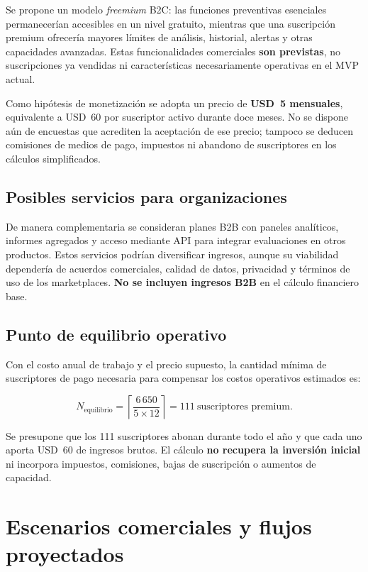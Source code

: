 Se propone un modelo \textit{freemium} B2C: las funciones preventivas esenciales permanecerían accesibles en un nivel gratuito, mientras que una suscripción premium ofrecería mayores límites de análisis, historial, alertas y otras capacidades avanzadas. Estas funcionalidades comerciales \textbf{son previstas}, no suscripciones ya vendidas ni características necesariamente operativas en el MVP actual.

Como hipótesis de monetización se adopta un precio de \textbf{USD~5 mensuales}, equivalente a USD~60 por suscriptor activo durante doce meses. No se dispone aún de encuestas que acrediten la aceptación de ese precio; tampoco se deducen comisiones de medios de pago, impuestos ni abandono de suscriptores en los cálculos simplificados.

\subsection{Posibles servicios para organizaciones}

De manera complementaria se consideran planes B2B con paneles analíticos, informes agregados y acceso mediante API para integrar evaluaciones en otros productos. Estos servicios podrían diversificar ingresos, aunque su viabilidad dependería de acuerdos comerciales, calidad de datos, privacidad y términos de uso de los marketplaces. \textbf{No se incluyen ingresos B2B} en el cálculo financiero base.

\subsection{Punto de equilibrio operativo}

Con el costo anual de trabajo y el precio supuesto, la cantidad mínima de suscriptores de pago necesaria para compensar los costos operativos estimados es:

\begin{equation}
N_{\mathrm{equilibrio}} = \left\lceil\frac{6\,650}{5\times12}\right\rceil = 111\ \text{suscriptores premium}.\label{eq:ml-equilibrio}
\end{equation}

Se presupone que los 111 suscriptores abonan durante todo el año y que cada uno aporta USD~60 de ingresos brutos. El cálculo \textbf{no recupera la inversión inicial} ni incorpora impuestos, comisiones, bajas de suscripción o aumentos de capacidad.

\section{Escenarios comerciales y flujos proyectados}\label{sec:ml-escenarios}

